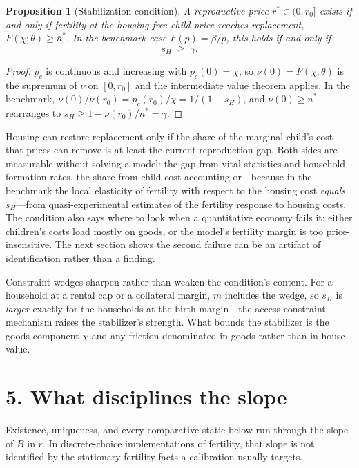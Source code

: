 \documentclass[11pt]{article}
\newtheorem{proposition}{Proposition}
\theoremstyle{definition}
\begin{document}
\begin{proposition}[Stabilization condition]\label{prop:stab}
A reproductive price $r^{*}\in(0,r_0]$ exists if and only if fertility at the
housing-free child price reaches replacement, $F(\chi;\theta)\ge\bar n^{*}$.
In the benchmark case $F(p)=\beta/p$, this holds if and only if
\begin{equation}
s_H\;\ge\;\gamma .
\label{eq:gapshare}
\end{equation}
\end{proposition}

\begin{proof}
$p_c$ is continuous and increasing with $p_c(0)=\chi$, so
$\nu(0)=F(\chi;\theta)$ is the supremum of $\nu$ on $[0,r_0]$ and the
intermediate value theorem applies. In the benchmark,
$\nu(0)/\nu(r_0)=p_c(r_0)/\chi=1/(1-s_H)$, and
$\nu(0)\ge\bar n^{*}$ rearranges to $s_H\ge1-\nu(r_0)/\bar n^{*}=\gamma$.
\end{proof}

Housing can restore replacement only if the share of the marginal child's cost
that prices can remove is at least the current reproduction gap. Both sides
are measurable without solving a model: the gap from vital statistics and
household-formation rates, the share from child-cost accounting or---because
in the benchmark the local elasticity of fertility with respect to the housing
cost \emph{equals} $s_H$---from quasi-experimental estimates of the fertility
response to housing costs. The condition also says where to look when a
quantitative economy fails it: either children's costs load mostly on goods,
or the model's fertility margin is too price-insensitive. The next section
shows the second failure can be an artifact of identification rather than a
finding.

Constraint wedges sharpen rather than weaken the condition's content. For a
household at a rental cap or a collateral margin, $m$ includes the wedge, so
$s_H$ is \emph{larger} exactly for the households at the birth margin---the
access-constraint mechanism raises the stabilizer's strength. What bounds the
stabilizer is the goods component $\chi$ and any friction denominated in goods
rather than in house value.

\section*{5. What disciplines the slope}

Existence, uniqueness, and every comparative static below run through the
slope of $B$ in $r$. In discrete-choice implementations of fertility, that
slope is not identified by the stationary fertility facts a calibration
usually targets.
\end{document}
